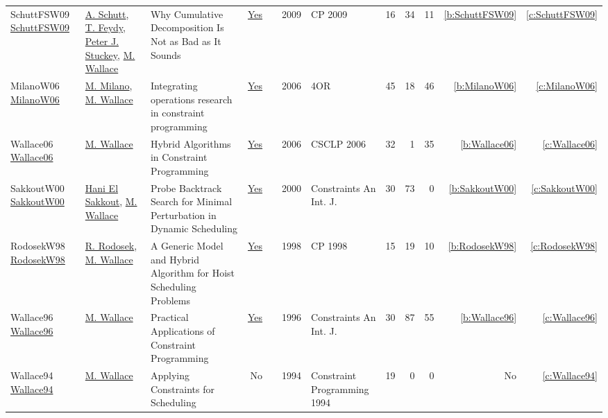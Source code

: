 {\begin{longtable}{>{\raggedright\arraybackslash}p{3cm}>{\raggedright\arraybackslash}p{6cm}>{\raggedright\arraybackslash}p{6.5cm}rrrp{2.5cm}rrrrr}
SchuttFSW09 \href{https://doi.org/10.1007/978-3-642-04244-7\_58}{SchuttFSW09} & \hyperref[auth:a125]{A. Schutt}, \hyperref[auth:a155]{T. Feydy}, \hyperref[auth:a126]{Peter J. Stuckey}, \hyperref[auth:a117]{M. Wallace} & Why Cumulative Decomposition Is Not as Bad as It Sounds & \href{works/SchuttFSW09.pdf}{Yes} & \cite{SchuttFSW09} & 2009 & CP 2009 & 16 & 34 & 11 & \ref{b:SchuttFSW09} & \ref{c:SchuttFSW09}\\
MilanoW06 \href{http://dx.doi.org/10.1007/s10288-006-0019-z}{MilanoW06} & \hyperref[auth:a144]{M. Milano}, \hyperref[auth:a117]{M. Wallace} & Integrating operations research in constraint programming & \href{works/MilanoW06.pdf}{Yes} & \cite{MilanoW06} & 2006 & 4OR & 45 & 18 & 46 & \ref{b:MilanoW06} & \ref{c:MilanoW06}\\
Wallace06 \href{http://dx.doi.org/10.1007/978-3-540-73817-6_1}{Wallace06} & \hyperref[auth:a117]{M. Wallace} & Hybrid Algorithms in Constraint Programming & \href{works/Wallace06.pdf}{Yes} & \cite{Wallace06} & 2006 & CSCLP 2006 & 32 & 1 & 35 & \ref{b:Wallace06} & \ref{c:Wallace06}\\
SakkoutW00 \href{https://doi.org/10.1023/A:1009856210543}{SakkoutW00} & \hyperref[auth:a168]{Hani El Sakkout}, \hyperref[auth:a117]{M. Wallace} & Probe Backtrack Search for Minimal Perturbation in Dynamic Scheduling & \href{works/SakkoutW00.pdf}{Yes} & \cite{SakkoutW00} & 2000 & Constraints An Int. J. & 30 & 73 & 0 & \ref{b:SakkoutW00} & \ref{c:SakkoutW00}\\
RodosekW98 \href{https://doi.org/10.1007/3-540-49481-2\_28}{RodosekW98} & \hyperref[auth:a300]{R. Rodosek}, \hyperref[auth:a117]{M. Wallace} & A Generic Model and Hybrid Algorithm for Hoist Scheduling Problems & \href{works/RodosekW98.pdf}{Yes} & \cite{RodosekW98} & 1998 & CP 1998 & 15 & 19 & 10 & \ref{b:RodosekW98} & \ref{c:RodosekW98}\\
Wallace96 \href{https://doi.org/10.1007/BF00143881}{Wallace96} & \hyperref[auth:a117]{M. Wallace} & Practical Applications of Constraint Programming & \href{works/Wallace96.pdf}{Yes} & \cite{Wallace96} & 1996 & Constraints An Int. J. & 30 & 87 & 55 & \ref{b:Wallace96} & \ref{c:Wallace96}\\
Wallace94 \href{}{Wallace94} & \hyperref[auth:a117]{M. Wallace} & Applying Constraints for Scheduling & No & \cite{Wallace94} & 1994 & Constraint Programming 1994 & 19 & 0 & 0 & No & \ref{c:Wallace94}\\
\end{longtable}
}

